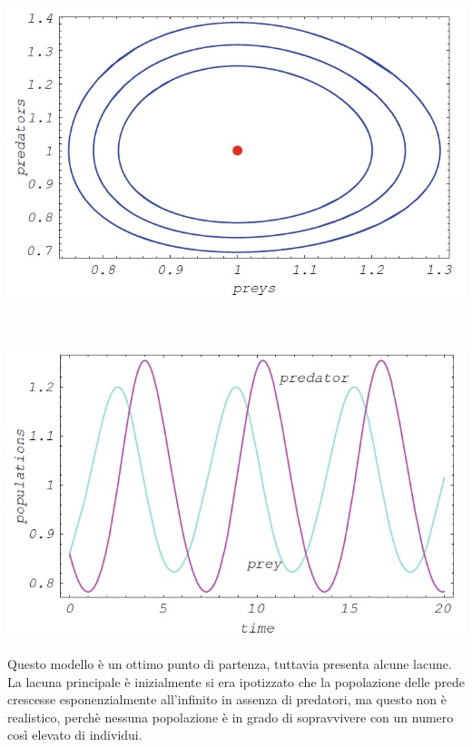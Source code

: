 \documentclass[12pt]{article}
\begin{document}
\begin{center}
  \begin{minipage}[b]{0.4\textwidth}
    \hspace{.5cm}\includegraphics[scale = .5]{Volterra1}
  \end{minipage}
  \ \ \ \ \ \ \ \ \ \ \ \ \ \ \ \
  \begin{minipage}[b]{0.4\textwidth}
    \hspace{-.7cm}\includegraphics[scale = .5]{Volterra2} 
  \end{minipage}
\end{center}
Questo modello è un ottimo punto di partenza, tuttavia presenta alcune lacune. La lacuna principale è inizialmente si era ipotizzato che la popolazione delle prede crescesse esponenzialmente all'infinito in assenza di predatori, ma questo non è realistico, perchè nessuna popolazione è in grado di sopravvivere con un numero così elevato di individui. \\
\end{document}
